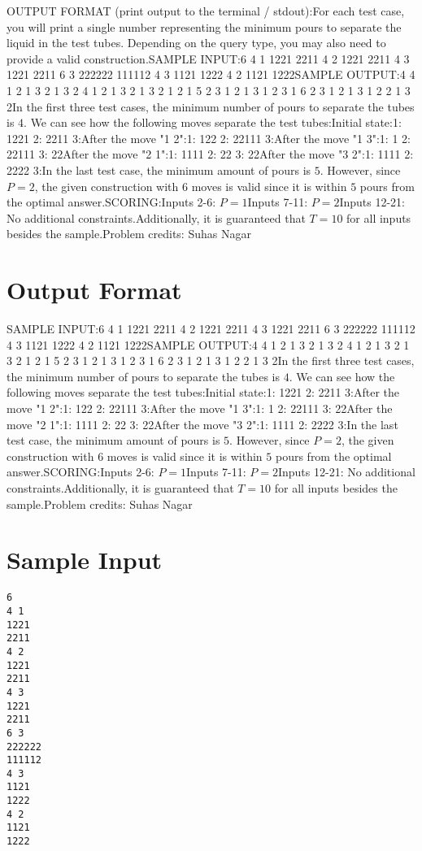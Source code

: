 \documentclass[12pt]{article}
\begin{document}
OUTPUT FORMAT (print output to the terminal / stdout):For each test case, you will print a single number representing the minimum
pours to separate the liquid in the test tubes. Depending on the query type, you
may also need to provide a valid construction.SAMPLE INPUT:6
4 1
1221
2211
4 2
1221
2211
4 3
1221
2211
6 3
222222
111112
4 3
1121
1222
4 2
1121
1222SAMPLE OUTPUT:4
4
1 2
1 3
2 1
3 2
4
1 2
1 3
2 1
3 2
1
2 1
5
2 3
1 2
1 3
1 2
3 1
6
2 3
1 2
1 3
1 2
2 1
3 2In the first three test cases, the minimum number of pours to separate the tubes
is $4$. We can see how the following moves separate the test tubes:Initial state:1: 1221
2: 2211
3:After the move "1 2":1: 122
2: 22111
3:After the move "1 3":1: 1
2: 22111
3: 22After the move "2 1":1: 1111
2: 22
3: 22After the move "3 2":1: 1111
2: 2222
3:In the last test case, the minimum amount of pours is $5$. However, since $P=2$,
the given construction with $6$ moves is valid since it is within $5$ pours from
the optimal answer.SCORING:Inputs 2-6: $P = 1$Inputs 7-11: $P=2$Inputs 12-21: No additional constraints.Additionally, it is guaranteed that $T=10$ for all inputs besides the sample.Problem credits: Suhas Nagar

\section*{Output Format}
SAMPLE INPUT:6
4 1
1221
2211
4 2
1221
2211
4 3
1221
2211
6 3
222222
111112
4 3
1121
1222
4 2
1121
1222SAMPLE OUTPUT:4
4
1 2
1 3
2 1
3 2
4
1 2
1 3
2 1
3 2
1
2 1
5
2 3
1 2
1 3
1 2
3 1
6
2 3
1 2
1 3
1 2
2 1
3 2In the first three test cases, the minimum number of pours to separate the tubes
is $4$. We can see how the following moves separate the test tubes:Initial state:1: 1221
2: 2211
3:After the move "1 2":1: 122
2: 22111
3:After the move "1 3":1: 1
2: 22111
3: 22After the move "2 1":1: 1111
2: 22
3: 22After the move "3 2":1: 1111
2: 2222
3:In the last test case, the minimum amount of pours is $5$. However, since $P=2$,
the given construction with $6$ moves is valid since it is within $5$ pours from
the optimal answer.SCORING:Inputs 2-6: $P = 1$Inputs 7-11: $P=2$Inputs 12-21: No additional constraints.Additionally, it is guaranteed that $T=10$ for all inputs besides the sample.Problem credits: Suhas Nagar

\section*{Sample Input}
\begin{verbatim}
6
4 1
1221
2211
4 2
1221
2211
4 3
1221
2211
6 3
222222
111112
4 3
1121
1222
4 2
1121
1222
\end{verbatim}
\end{document}

